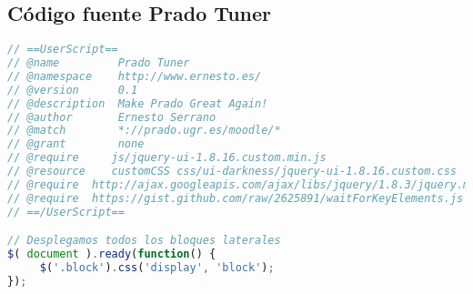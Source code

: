 \subsection{Código fuente Prado Tuner}
\begin{lstlisting}[language=javascript]
// ==UserScript==
// @name         Prado Tuner
// @namespace    http://www.ernesto.es/
// @version      0.1
// @description  Make Prado Great Again!
// @author       Ernesto Serrano
// @match        *://prado.ugr.es/moodle/*
// @grant        none
// @require     js/jquery-ui-1.8.16.custom.min.js
// @resource    customCSS css/ui-darkness/jquery-ui-1.8.16.custom.css
// @require  http://ajax.googleapis.com/ajax/libs/jquery/1.8.3/jquery.min.js
// @require  https://gist.github.com/raw/2625891/waitForKeyElements.js
// ==/UserScript==

// Desplegamos todos los bloques laterales
$( document ).ready(function() {
     $('.block').css('display', 'block');
});
\end{lstlisting}

\newpage
